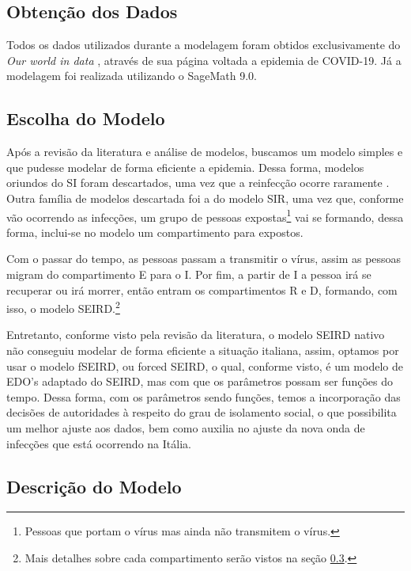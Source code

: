 \documentclass{article}
\begin{document}
\subsection{Obtenção dos Dados} %

Todos os dados utilizados durante a modelagem foram obtidos exclusivamente do \textit{Our world in data} \cite{owid}, através de sua página voltada a epidemia de COVID-19. Já a modelagem foi realizada utilizando o SageMath 9.0.

\subsection{Escolha do Modelo}

Após a revisão da literatura e análise de modelos, buscamos um modelo simples e que pudesse modelar de forma eficiente a epidemia. Dessa forma, modelos oriundos do SI foram descartados, uma vez que a reinfecção ocorre raramente \cite{again}. Outra família de modelos descartada foi a do modelo SIR, uma vez que, conforme vão ocorrendo as infecções, um grupo de pessoas expostas\footnote{Pessoas que portam o vírus mas ainda não transmitem o vírus.} vai se formando, dessa forma, inclui-se no modelo um compartimento para expostos.

Com o passar do tempo, as pessoas passam a transmitir o vírus, assim as pessoas migram do compartimento E para o I. Por fim, a partir de I a pessoa irá se recuperar ou irá morrer, então entram os compartimentos R e D, formando, com isso, o modelo SEIRD.\footnote{Mais detalhes sobre cada compartimento serão vistos na seção \ref{descrição_do_modelo}.}

Entretanto, conforme visto pela revisão da literatura, o modelo SEIRD nativo não conseguiu modelar de forma eficiente a situação italiana, assim, optamos por usar o modelo fSEIRD, ou forced SEIRD, o qual, conforme visto, é um modelo de EDO's adaptado do SEIRD, mas com que os parâmetros possam ser funções do tempo. Dessa forma, com os parâmetros sendo funções, temos a incorporação das decisões de autoridades à respeito do grau de isolamento social, o que possibilita um melhor ajuste aos dados, bem como auxilia no ajuste da nova onda de infecções que está ocorrendo na Itália.

\subsection{Descrição do Modelo} \label{descrição_do_modelo}
\end{document}
